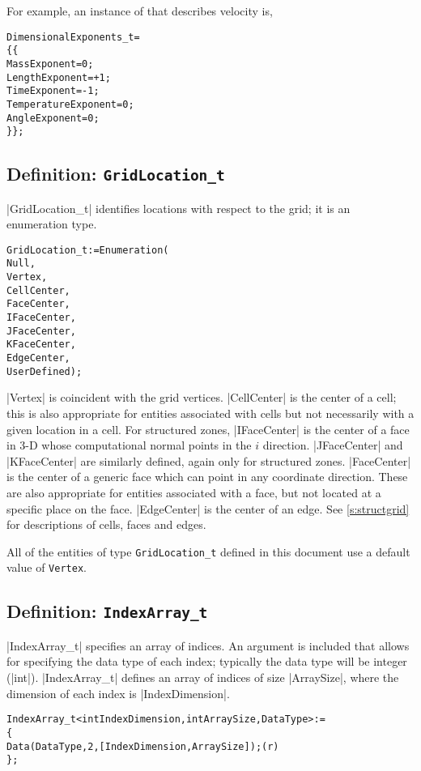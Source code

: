 For example, an instance of  that describes 
velocity is,

\begin{alltt}
  DimensionalExponents\_t =
    \{\{
    MassExponent        =  0 ;
    LengthExponent      = +1 ;
    TimeExponent        = -1 ;
    TemperatureExponent =  0 ;
    AngleExponent       =  0 ;
    \}\} ;
\end{alltt}

\subsection{Definition: \texttt{GridLocation\_t}}
\label{s:GridLocation}

|GridLocation_t| identifies locations with respect to the grid; it is an
enumeration type.
\begin{alltt}
  GridLocation\_t := Enumeration( 
    Null,
    Vertex,
    CellCenter,
    FaceCenter,
    IFaceCenter,
    JFaceCenter,
    KFaceCenter,
    EdgeCenter,
    UserDefined ) ;
\end{alltt}
|Vertex| is coincident with the grid vertices.
|CellCenter| is the center of a cell; this is also appropriate for
entities associated with cells but not necessarily with a given
location in a cell.
For structured zones, |IFaceCenter| is the center of a face in 3-D
whose computational normal points in the $i$ direction.
|JFaceCenter| and |KFaceCenter| are similarly defined,
again only for structured zones.
|FaceCenter| is the center of a generic face which can point in any
coordinate direction.
These are also appropriate for entities associated with a face, but not
located at a specific place on the face.
|EdgeCenter| is the center of an edge.
See \autoref{s:structgrid} for descriptions of cells, faces and edges.

All of the entities of type \texttt{GridLocation\_t} defined in this
document use a default value of \texttt{Vertex}.

\subsection{Definition: \texttt{IndexArray\_t}}
\label{s:IndexArray}

|IndexArray_t| specifies an array of indices.  An argument is included that 
allows for specifying the data type of each index; typically the data type
will be integer (|int|).  |IndexArray_t| defines an array of indices of size 
|ArraySize|, where the dimension of each index is |IndexDimension|.
\begin{alltt}
  IndexArray\_t< int IndexDimension, int ArraySize, DataType > :=
    \{
    Data( DataType, 2, [IndexDimension,ArraySize] ) ;                       (r)
    \} ;
\end{alltt}

